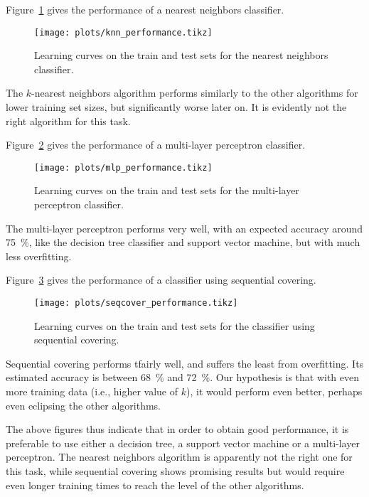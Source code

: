 \documentclass{sigkddExp}
\begin{document}
Figure~\ref{fig:knn_performance} gives the performance of a nearest neighbors classifier.
\begin{figure}[!hbtp]
	\centering
	\texttt{[image: plots/knn\_performance.tikz]}
	\caption{Learning curves on the train and test sets for the nearest neighbors classifier.}
	\label{fig:knn_performance}
\end{figure}
The \(k\)-nearest neighbors algorithm performs similarly to the other algorithms for lower training set sizes, but significantly worse later on.
It is evidently not the right algorithm for this task.

Figure~\ref{fig:mlp_performance} gives the performance of a multi-layer perceptron classifier.
\begin{figure}[!hbtp]
	\centering
	\texttt{[image: plots/mlp\_performance.tikz]}
	\caption{Learning curves on the train and test sets for the multi-layer perceptron classifier.}
	\label{fig:mlp_performance}
\end{figure}
The multi-layer perceptron performs very well, with an expected accuracy around \SI{75}{\percent}, like the decision tree classifier and support vector machine, but with much less overfitting.

Figure~\ref{fig:sc_performance} gives the performance of a classifier using sequential covering.
\begin{figure}[!hbtp]
	\centering
	\texttt{[image: plots/seqcover\_performance.tikz]}
	\caption{Learning curves on the train and test sets for the classifier using sequential covering.}
	\label{fig:sc_performance}
\end{figure}
Sequential covering performs tfairly well, and suffers the least from overfitting.
Its estimated accuracy is between \SI{68}{\percent} and \SI{72}{\percent}.
Our hypothesis is that with even more training data (i.e., higher value of \(k\)), it would perform even better, perhaps even eclipsing the other algorithms.

The above figures thus indicate that in order to obtain good performance, it is preferable to use either a decision tree, a support vector machine or a multi-layer perceptron.
The nearest neighbors algorithm is apparently not the right one for this task, while sequential covering shows promising results but would require even longer training times to reach the level of the other algorithms.
\end{document}
